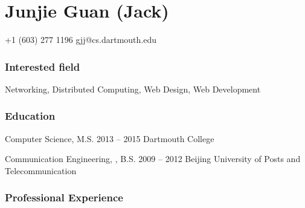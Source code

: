 \documentclass{tccv}
\begin{document}
\part{Junjie Guan (Jack)}

\begin{multicols}{2}

    {+1 (603) 277 1196}
    {gjj@cs.dartmouth.edu}

\section{Interested field}
Networking, Distributed Computing, \newline Web Design, Web Development


\section{Education}

\begin{yearlist}

\item[Computer Science, M.S.]{2013 -- 2015}
     {Dartmouth College}

\item[Communication Engineering, , B.S.]{2009 -- 2012}
     {Beijing University of Posts and Telecommunication}

\end{yearlist}

\end{multicols}















\section{Professional Experience}
\end{document}
